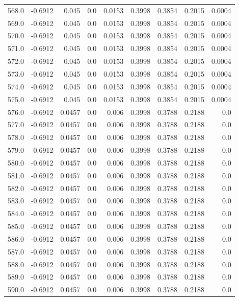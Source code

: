 \begin{longtable}{lrrrrrrrr}
568.0 & -0.6912 & 0.045 & 0.0 & 0.0153 & 0.3998 & 0.3854 & 0.2015 & 0.0004 \\
569.0 & -0.6912 & 0.045 & 0.0 & 0.0153 & 0.3998 & 0.3854 & 0.2015 & 0.0004 \\
570.0 & -0.6912 & 0.045 & 0.0 & 0.0153 & 0.3998 & 0.3854 & 0.2015 & 0.0004 \\
571.0 & -0.6912 & 0.045 & 0.0 & 0.0153 & 0.3998 & 0.3854 & 0.2015 & 0.0004 \\
572.0 & -0.6912 & 0.045 & 0.0 & 0.0153 & 0.3998 & 0.3854 & 0.2015 & 0.0004 \\
573.0 & -0.6912 & 0.045 & 0.0 & 0.0153 & 0.3998 & 0.3854 & 0.2015 & 0.0004 \\
574.0 & -0.6912 & 0.045 & 0.0 & 0.0153 & 0.3998 & 0.3854 & 0.2015 & 0.0004 \\
575.0 & -0.6912 & 0.045 & 0.0 & 0.0153 & 0.3998 & 0.3854 & 0.2015 & 0.0004 \\
576.0 & -0.6912 & 0.0457 & 0.0 & 0.006 & 0.3998 & 0.3788 & 0.2188 & 0.0 \\
577.0 & -0.6912 & 0.0457 & 0.0 & 0.006 & 0.3998 & 0.3788 & 0.2188 & 0.0 \\
578.0 & -0.6912 & 0.0457 & 0.0 & 0.006 & 0.3998 & 0.3788 & 0.2188 & 0.0 \\
579.0 & -0.6912 & 0.0457 & 0.0 & 0.006 & 0.3998 & 0.3788 & 0.2188 & 0.0 \\
580.0 & -0.6912 & 0.0457 & 0.0 & 0.006 & 0.3998 & 0.3788 & 0.2188 & 0.0 \\
581.0 & -0.6912 & 0.0457 & 0.0 & 0.006 & 0.3998 & 0.3788 & 0.2188 & 0.0 \\
582.0 & -0.6912 & 0.0457 & 0.0 & 0.006 & 0.3998 & 0.3788 & 0.2188 & 0.0 \\
583.0 & -0.6912 & 0.0457 & 0.0 & 0.006 & 0.3998 & 0.3788 & 0.2188 & 0.0 \\
584.0 & -0.6912 & 0.0457 & 0.0 & 0.006 & 0.3998 & 0.3788 & 0.2188 & 0.0 \\
585.0 & -0.6912 & 0.0457 & 0.0 & 0.006 & 0.3998 & 0.3788 & 0.2188 & 0.0 \\
586.0 & -0.6912 & 0.0457 & 0.0 & 0.006 & 0.3998 & 0.3788 & 0.2188 & 0.0 \\
587.0 & -0.6912 & 0.0457 & 0.0 & 0.006 & 0.3998 & 0.3788 & 0.2188 & 0.0 \\
588.0 & -0.6912 & 0.0457 & 0.0 & 0.006 & 0.3998 & 0.3788 & 0.2188 & 0.0 \\
589.0 & -0.6912 & 0.0457 & 0.0 & 0.006 & 0.3998 & 0.3788 & 0.2188 & 0.0 \\
590.0 & -0.6912 & 0.0457 & 0.0 & 0.006 & 0.3998 & 0.3788 & 0.2188 & 0.0 \\

\end{longtable}
